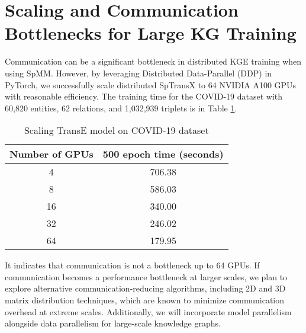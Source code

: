 \section{Scaling and Communication Bottlenecks for Large KG Training}
\label{A:scaling}
Communication can be a significant bottleneck in distributed KGE training when using SpMM. However, by leveraging Distributed Data-Parallel (DDP) in PyTorch, we successfully scale distributed SpTransX to 64 NVIDIA A100 GPUs with reasonable efficiency. The training time for the COVID-19 dataset with 60,820 entities, 62 relations, and 1,032,939 triplets is in Table \ref{table:scaling}. 
\begin{table}[h]
\centering
\caption{Scaling TransE model on COVID-19 dataset}
\begin{tabular}{|c|c|}
\hline
\textbf{Number of GPUs} & \textbf{500 epoch time (seconds)} \\ \hline
4                       & 706.38                            \\ \hline
8                       & 586.03                            \\ \hline
16                      & 340.00                               \\ \hline
32                      & 246.02                            \\ \hline
64                      & 179.95                            \\ \hline
\end{tabular}
\label{table:scaling}
\end{table}
It indicates that communication is not a bottleneck up to 64 GPUs. If communication becomes a performance bottleneck at larger scales, we plan to explore alternative communication-reducing algorithms, including 2D and 3D matrix distribution techniques, which are known to minimize communication overhead at extreme scales. Additionally, we will incorporate model parallelism alongside data parallelism for large-scale knowledge graphs.

